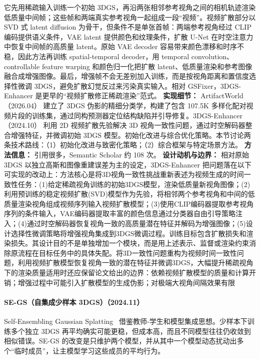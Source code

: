 它先用稀疏输入训练一个初始 3DGS，再沿两张相邻参考视角之间的相机轨迹渲染低质量中间帧；这些帧和两端真实参考视角一起组成一段“视频”。视频扩散部分以 SVD 式 latent diffusion 为骨干，但条件不是单张首帧：两端参考视角经过 CLIP 编码提供语义条件，VAE latent 提供颜色和纹理条件，扩散 U-Net 在时空注意力中恢复中间帧的高质量 latent。原始 VAE decoder 容易带来颜色漂移和时序不稳，因此方法再训练 spatial-temporal decoder，用 temporal convolution、controllable feature warping 和颜色归一化把扩散 latent、低质量渲染和参考图像融合成增强图像。最后，增强帧不会无差别加入训练，而是按视角距离和置信度选择性微调 3DGS，避免扩散幻觉反过来污染真实输入。相对 GSFixer，3DGS-Enhancer 是更早的“视频扩散修正稀疏渲染”范式。
\textbf{实现细节：} ArtifactWorld（2026.04） 建立了 3DGS 伪影的精细分类学，构建了包含 107.5K 多样化配对视频片段的训练集，通过同构预测器定位结构缺陷并引导修复。3DGS-Enhancer（2024.10） 利用 2D 视频扩散先验解决 3D 视角一致性问题，通过时空解码器整合增强特征，并微调初始 3DGS 模型。初始化改进与综合优化策略。本节讨论两条技术路线：（1）初始化改进与致密化策略；（2）综合框架与特定场景方法。
\textbf{方法信息：} 引用很多，Semantic Scholar 约 108 次。
\textbf{设计动机与边界：} 相对原始 3DGS 以独立高斯和图像重建误差为主的设定，3DGS-Enhancer 把问题落在以下可实现的改动上：方法核心是将3D视角一致性挑战重新表述为视频生成的时间一致性任务：(1)给定稀疏视角训练的初始3DGS模型，渲染低质量新视角图像；(2)利用预训练的稳定视频扩散(SVD)模型作为先验，将相邻两个参考视角和中间的低质量渲染视角组成视频序列输入视频扩散模型；(3)使用CLIP编码器提取参考视角序列的条件输入，VAE编码器提取丰富的颜色信息通过分类器自由引导策略注入；(4)通过时空解码器恢复视角一致的高质量潜在特征并解码为增强图像；(5)设计选择性微调策略将增强视角集成到3DGS微调过程。训练目标包含扩散损失和渲染损失。其设计目的不是单独增加一个模块，而是用上述表示、监督或渲染约束消除原流程在目标任务中的具体失配。将3D一致性问题重构为视频时间一致性问题，利用视频扩散模型恢复视角一致的潜在特征并微调3DGS，大幅提升稀疏视角下的渲染质量适用时还应保留论文给出的边界：依赖视频扩散模型的质量和计算开销；增强过程中可能引入扩散模型的生成伪影；对极端大视角间隔效果有限
\paragraph{SE-GS（自集成少样本 3DGS）（2024.11）}
Self-Ensembling Gaussian Splatting~\cite{2411_00144} 借鉴教师-学生和模型集成思想。少样本下训练多个独立 3DGS 再平均确实可能更稳，但成本高，而且不同模型往往仍收敛到相似错误。SE-GS 的改变是只维护两个模型，并从其中一个模型动态扰动出多个“临时成员”，让主模型学习这些成员的平均行为。

